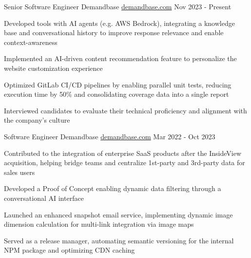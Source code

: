 

\begin{cventries}

\cventry
{Senior Software Engineer} %
{Demandbase} %
{\href{https://www.demandbase.com/}{demandbase.com}} %
{Nov 2023 - Present} %
{
  \begin{cvitems} %
    \item {Developed tools with AI agents (e.g. AWS Bedrock), integrating a knowledge base and conversational history to improve response relevance and enable context-awareness}
    \item {Implemented an AI-driven content recommendation feature to personalize the website customization experience}
    \item {Optimized GitLab CI/CD pipelines by enabling parallel unit tests, reducing execution time by 50\% and consolidating coverage data into a single report}
    \item {Interviewed candidates to evaluate their technical proficiency and alignment with the company's culture}
  \end{cvitems}
}

\cventry
{Software Engineer} %
{Demandbase} %
{\href{https://www.demandbase.com/}{demandbase.com}} %
{Mar 2022 - Oct 2023} %
{
  \begin{cvitems} %
    \item {Contributed to the integration of enterprise SaaS products after the InsideView acquisition, helping bridge teams and centralize 1st-party and 3rd-party data for sales users}
    \item {Developed a Proof of Concept enabling dynamic data filtering through a conversational AI interface}
    \item {Launched an enhanced snapshot email service, implementing dynamic image dimension calculation for multi-link integration via image maps}
    \item {Served as a release manager, automating semantic versioning for the internal NPM package and optimizing CDN caching}
  \end{cvitems}
}


\end{cventries}
